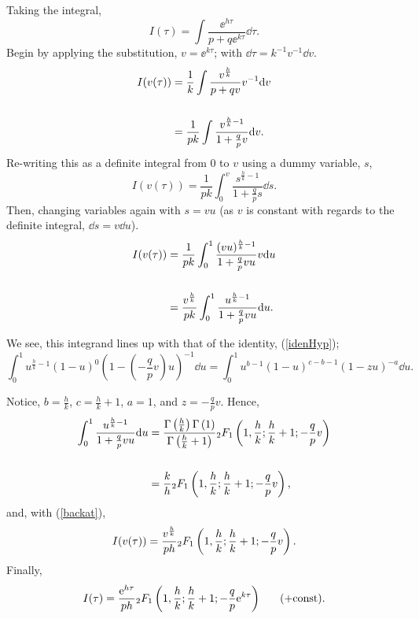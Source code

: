 Taking the integral,
$$I(\tau) = \int\frac{\ee^{h\tau}}{p+q\ee^{k\tau}}\dd\tau.$$
Begin by applying the substitution, $v = \ee^{k\tau}$; with $\dd\tau = k^{-1}v^{-1} \dd v$.
\begin{align*}
I(v(\tau)) &= \frac{1}{k}\int\frac{v^{\frac{h}{k}}}{p+qv}v^{-1}{\rm d} v\\
\notag\\
&= \frac{1}{pk}\int\frac{v^{\frac{h}{k}-1}}{1+\frac{q}{p}v}{\rm d} v.
\end{align*}
Re-writing this as a definite integral from 0 to $v$ using a dummy variable, $s$,
$$I(v(\tau)) = \frac{1}{pk}\int^v_0\frac{s^{\frac{h}{k}-1}}{1+\frac{q}{p}s}\dd s.$$
Then, changing variables again with $s = vu$ (as $v$ is constant with regards to the definite integral, $\dd s = v\dd u$).
\begin{align}
I(v(\tau)) &= \frac{1}{pk}\int^1_0\frac{(vu)^{\frac{h}{k}-1}}{1+\frac{q}{p}vu} v {\rm d} u\notag\\
\notag\\
&= \frac{v^{\frac{h}{k}}}{pk}\int^1_0\frac{u^{\frac{h}{k}-1}}{1+\frac{q}{p}vu}  {\rm d} u.\label{backat}
\end{align}

\noindent
We see, this integrand lines up with that of the identity, (\ref{idenHyp});
\begin{equation*}
\int^1_0u^{\frac{h}{k}-1}(1-u)^0 \left(1-\left(-\frac{q}{p}v\right) u\right)^{-1} \dd u= \int^1_0 u^{b-1}(1-u)^{c-b-1}(1-zu)^{-a} \dd u.
\end{equation*}

\noindent
Notice, $b = \frac{h}{k}$, $c = \frac{h}{k}+1$,  $a = 1$,  and $z = -\frac{q}{p}v$. Hence,
\begin{align*}
\int^1_0\frac{u^{\frac{h}{k}-1}}{1+\frac{q}{p}vu}  {\rm d} u &= \frac{\Gamma\left(\frac{h}{k}\right) \Gamma\left(1\right)}{\Gamma\left(\frac{h}{k} +1\right)} {}_2F_1\left(1,\frac{h}{k};\frac{h}{k}+1; -\frac{q}{p}v\right)\\
\notag\\
&= \frac{k}{h} {}_2F_1\left(1,\frac{h}{k};\frac{h}{k}+1; -\frac{q}{p}v\right),
\end{align*}
and, with (\ref{backat}),
\begin{equation*}
I(v(\tau)) = \frac{v^{\frac{h}{k}}}{ph}{}_2F_1\left(1,\frac{h}{k};\frac{h}{k}+1; -\frac{q}{p}v\right).
\end{equation*}
Finally,
$$I(\tau) = \frac{{\rm e}^{h\tau}}{ph}{}_2F_1\left(1,\frac{h}{k};\frac{h}{k}+1; -\frac{q}{p}{\rm e}^{k\tau}\right)\hspace{17pt} (+ \text{const}).$$


